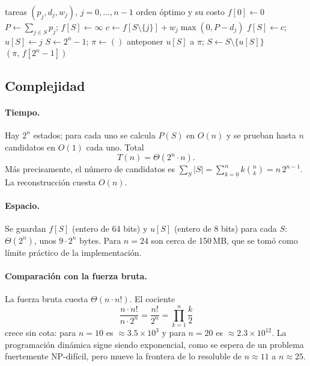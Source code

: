 \documentclass[10pt,twocolumn,letterpaper]{article}
\begin{document}
\begin{algorithm}[h]
\caption{Programación dinámica sobre subconjuntos}\label{alg:dp}
\begin{algorithmic}[1]
\Require tareas $(p_j,d_j,w_j)$, $j=0,\dots,n-1$
\Ensure orden óptimo y su costo
\State $f[0]\gets0$
  \State $P\gets\sum_{j\in S}p_j$; \quad $f[S]\gets\infty$
    \State $c\gets f[S\setminus\{j\}]+w_j\max(0,P-d_j)$
     $f[S]\gets c$;\; $u[S]\gets j$ \EndIf
  \EndFor
\EndFor
\State $S\gets2^n-1$;\; $\pi\gets()$
  \State anteponer $u[S]$ a $\pi$;\; $S\gets S\setminus\{u[S]\}$
\EndWhile
\State \Return $(\pi,\,f[2^n-1])$
\end{algorithmic}
\end{algorithm}

\subsection{Complejidad}

\paragraph{Tiempo.} Hay $2^n$ estados; para cada uno se calcula $P(S)$ en
$O(n)$ y se prueban hasta $n$ candidatos en $O(1)$ cada uno. Total
\[
T(n)=\Theta(2^n\cdot n).
\]
Más precisamente, el número de candidatos es
$\sum_{S}|S|=\sum_{k=0}^{n}k\binom{n}{k}=n\,2^{n-1}$. La reconstrucción cuesta
$O(n)$.

\paragraph{Espacio.} Se guardan $f[S]$ (entero de 64 bits) y $u[S]$ (entero de
8 bits) para cada $S$: $\Theta(2^n)$, unos $9\cdot2^n$ bytes. Para $n=24$ son
cerca de 150\,MB, que se tomó como límite práctico de la implementación.

\paragraph{Comparación con la fuerza bruta.} La fuerza bruta cuesta
$\Theta(n\cdot n!)$. El cociente
\[
\frac{n\cdot n!}{n\cdot2^n}=\frac{n!}{2^n}=\prod_{k=1}^{n}\frac{k}{2}
\]
crece sin cota: para $n=10$ es $\approx3.5\times10^3$ y para $n=20$ es
$\approx2.3\times10^{12}$. La programación dinámica sigue siendo exponencial,
como se espera de un problema fuertemente NP-difícil, pero mueve la frontera
de lo resoluble de $n\approx11$ a $n\approx25$.
\end{document}
